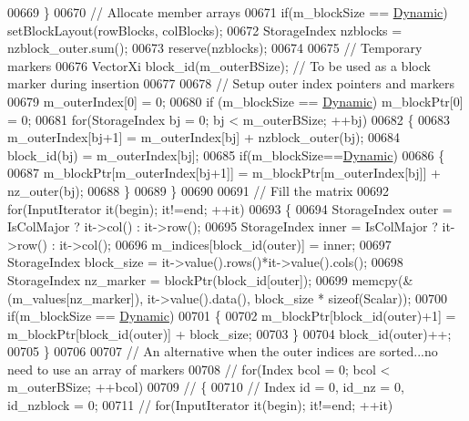 \begin{DoxyCode}
00669       \}
00670       \textcolor{comment}{// Allocate member arrays}
00671       \textcolor{keywordflow}{if}(m\_blockSize == \hyperlink{namespace_eigen_ad81fa7195215a0ce30017dfac309f0b2}{Dynamic}) setBlockLayout(rowBlocks, colBlocks);
00672       StorageIndex nzblocks = nzblock\_outer.sum();
00673       reserve(nzblocks);
00674 
00675        \textcolor{comment}{// Temporary markers}
00676       VectorXi block\_id(m\_outerBSize); \textcolor{comment}{// To be used as a block marker during insertion}
00677 
00678       \textcolor{comment}{// Setup outer index pointers and markers}
00679       m\_outerIndex[0] = 0;
00680       \textcolor{keywordflow}{if} (m\_blockSize == \hyperlink{namespace_eigen_ad81fa7195215a0ce30017dfac309f0b2}{Dynamic})  m\_blockPtr[0] =  0;
00681       \textcolor{keywordflow}{for}(StorageIndex bj = 0; bj < m\_outerBSize; ++bj)
00682       \{
00683         m\_outerIndex[bj+1] = m\_outerIndex[bj] + nzblock\_outer(bj);
00684         block\_id(bj) = m\_outerIndex[bj];
00685         \textcolor{keywordflow}{if}(m\_blockSize==\hyperlink{namespace_eigen_ad81fa7195215a0ce30017dfac309f0b2}{Dynamic})
00686         \{
00687           m\_blockPtr[m\_outerIndex[bj+1]] = m\_blockPtr[m\_outerIndex[bj]] + nz\_outer(bj);
00688         \}
00689       \}
00690 
00691       \textcolor{comment}{// Fill the matrix}
00692       \textcolor{keywordflow}{for}(InputIterator it(begin); it!=end; ++it)
00693       \{
00694         StorageIndex outer = IsColMajor ? it->col() : it->row();
00695         StorageIndex inner = IsColMajor ? it->row() : it->col();
00696         m\_indices[block\_id(outer)] = inner;
00697         StorageIndex block\_size = it->value().rows()*it->value().cols();
00698         StorageIndex nz\_marker = blockPtr(block\_id[outer]);
00699         memcpy(&(m\_values[nz\_marker]), it->value().data(), block\_size * \textcolor{keyword}{sizeof}(Scalar));
00700         \textcolor{keywordflow}{if}(m\_blockSize == \hyperlink{namespace_eigen_ad81fa7195215a0ce30017dfac309f0b2}{Dynamic})
00701         \{
00702           m\_blockPtr[block\_id(outer)+1] = m\_blockPtr[block\_id(outer)] + block\_size;
00703         \}
00704         block\_id(outer)++;
00705       \}
00706 
00707       \textcolor{comment}{// An alternative when the outer indices are sorted...no need to use an array of markers}
00708 \textcolor{comment}{//      for(Index bcol = 0; bcol < m\_outerBSize; ++bcol)}
00709 \textcolor{comment}{//      \{}
00710 \textcolor{comment}{//      Index id = 0, id\_nz = 0, id\_nzblock = 0;}
00711 \textcolor{comment}{//      for(InputIterator it(begin); it!=end; ++it)}

\end{DoxyCode}
